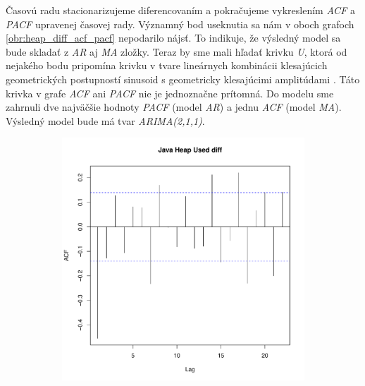\documentclass[12pt,a4paper,oneside,final]{article}
\theoremstyle{definition}
\theoremstyle{remark}
\numberwithin{equation}{section}
\begin{document}
Časovú radu stacionarizujeme diferencovaním a pokračujeme vykreslením \emph{ACF} a
\emph{PACF} upravenej časovej rady. 
Významný bod useknutia sa nám v oboch grafoch \ref{obr:heap_diff_acf_pacf} nepodarilo nájsť. 
To indikuje, že výsledný 
model sa bude skladať z \emph{AR} aj \emph{MA} zložky. Teraz by sme mali hľadať krivku 
\emph{U}, ktorá od nejakého bodu pripomína krivku v tvare lineárnych kombinácii klesajúcich
geometrických postupností sinusoid s geometricky klesajúcimi amplitúdami \cite{cipra}.
Táto krivka v grafe \emph{ACF} ani \emph{PACF} nie je jednoznačne prítomná. Do modelu sme zahrnuli dve najväčšie 
hodnoty \emph{PACF} (model \emph{AR}) a jednu \emph{ACF} (model \emph{MA}).
Výsledný model bude má tvar \emph{ARIMA(2,1,1)}.

\begin{figure}[H] \centering
    \begin{subfigure}[b]{0.45\textwidth}
        \centering
        \includegraphics[width=1\linewidth]{images/heap_diff_acf.pdf}
    \end{subfigure}
    \begin{subfigure}[b]{0.45\textwidth}
        \centering

\end{subfigure}
\end{figure}
\end{document}
